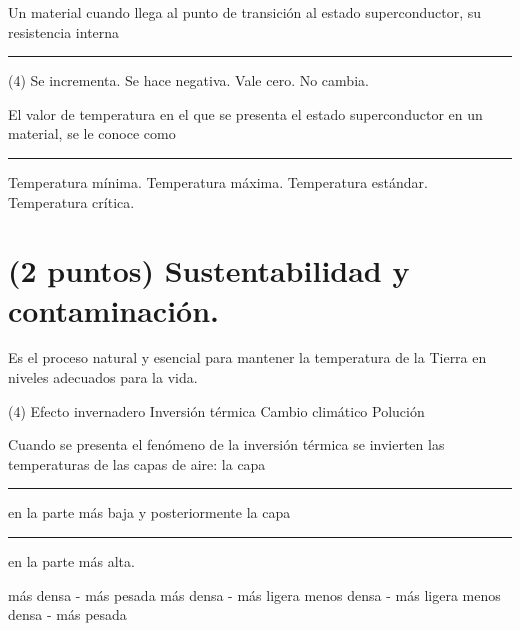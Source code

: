 \documentclass[12pt, letter]{exam}
\begin{document}
\begin{questions}
    \question Un material cuando llega al punto de transición al estado superconductor, su resistencia interna \rule{2cm}{0.1mm}
    \begin{tasks}(4)
        \task Se incrementa.
        \task Se hace negativa.
        \task Vale cero.
        \task No cambia.
    \end{tasks}
    \question El valor de temperatura en el que se presenta el estado superconductor en un material, se le conoce como \rule{2cm}{0.1mm}
    \begin{multicols}{2}
        \begin{tasks}
        \task Temperatura mínima.
        \task Temperatura máxima.
        \task Temperatura estándar.
        \task Temperatura crítica.
    \end{tasks}
    \end{multicols}

    \section{(2 puntos) Sustentabilidad y contaminación.}

    \question Es el proceso natural y esencial para mantener la temperatura de la Tierra en niveles adecuados para la vida.
    \begin{tasks}(4)
        \task Efecto invernadero
        \task Inversión térmica
        \task Cambio climático
        \task Polución
    \end{tasks}
    \question Cuando se presenta el fenómeno de la inversión térmica se invierten las temperaturas de las capas de aire: la capa \rule{2cm}{0.1mm} en la parte más baja y posteriormente la capa \rule{2cm}{0.1mm} en la parte más alta.
    \begin{multicols}{2}
        \begin{tasks}
            \task más densa - más pesada
            \task más densa - más ligera
            \task menos densa - más ligera
            \task menos densa - más pesada
        \end{tasks}
    \end{multicols}

\end{questions}
\end{document}
